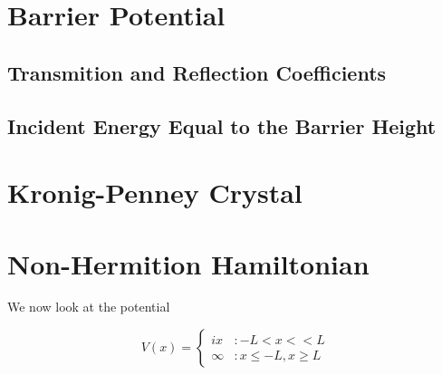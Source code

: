 \documentclass{article}
\begin{document}
\section{Barrier Potential}

\subsection{Transmition and Reflection Coefficients}

\subsection{Incident Energy Equal to the Barrier Height}

\section{Kronig-Penney Crystal}

\section{Non-Hermition Hamiltonian}

We now look at the potential 

\[V(x) = \left\{
  \begin{array}{lr}
    ix &  : -L < x < < L \\
    \infty & : x \leq -L , x \geq L 
  \end{array}
\right.
\]
\end{document}
